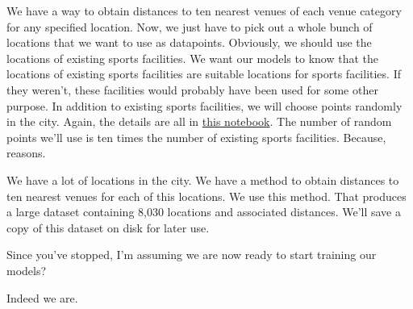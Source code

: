 We have a way to obtain distances to ten nearest venues of each venue category for any specified location. Now, we just have to pick out a whole bunch of locations that we want to use as datapoints. Obviously, we should use the locations of existing sports facilities. We want our models to know that the locations of existing sports facilities are suitable locations for sports facilities. If they weren't, these facilities would probably have been used for some other purpose. In addition to existing sports facilities, we will choose points randomly in the city. Again, the details are all in \href{https://github.com/saba-vadarevu/IBM-dataScience-Capstone/blob/master/final/preprocessing.ipynb}{this notebook}. The number of random points we'll use is ten times the number of existing sports facilities. Because, reasons.

We have a lot of locations in the city. We have a method to obtain distances to ten nearest venues for each of this locations. We use this method. That produces a large dataset containing 8,030 locations and associated distances. We'll save a copy of this dataset on disk for later use. 

{\color{blue} Since you've stopped, I'm assuming we are now ready to start training our models?}

Indeed we are.
